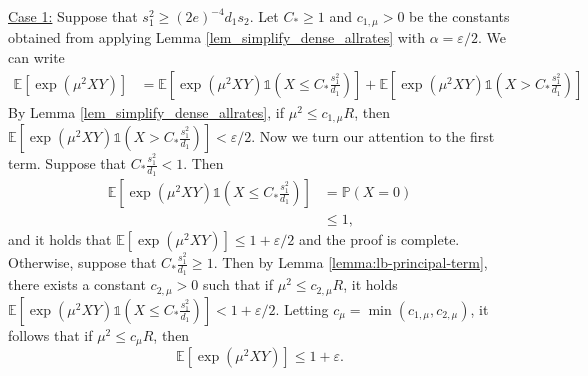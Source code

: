 \documentclass{article}
\newcommand{\bbP}{\mathbb{P}}
\newcommand{\EE}{\mathbb{E}}
\newcommand{\one}{\mathds{1}}
\newcommand{\eps}{\varepsilon} %
\newcommand{\Ct}{C_{*}}
\theoremstyle{remark}
\begin{document}
\bigskip 

\noindent\underline{Case 1:} Suppose that $s_1^2 \geq (2e)^{-4}d_1s_2$. Let $\Ct \geq 1$ and $c_{1, \mu} > 0$ be the constants obtained from applying Lemma \ref{lem_simplify_dense_allrates} with $\alpha = \eps/2$. We can write
\begin{align*}
\EE[\exp(\mu^2XY)] &= \EE[\exp(\mu^2XY)\one(X \leq \Ct \frac{s_1^2}{d_1})] + \EE[\exp(\mu^2XY)\one(X > \Ct \frac{s_1^2}{d_1})]
\end{align*}
By Lemma \ref{lem_simplify_dense_allrates}, if $\mu^2 \leq c_{1, \mu}R$, then $\EE[\exp(\mu^2XY)\one(X > \Ct \frac{s_1^2}{d_1})] < \eps/2$.
Now we turn our attention to the first term. Suppose that $\Ct \frac{s_1^2}{d_1} < 1$. Then
\begin{align*}
    \EE[\exp(\mu^2XY)\one(X \leq \Ct \frac{s_1^2}{d_1})] &= \bbP(X = 0) \\
    &\leq 1,
\end{align*}
and it holds that $\EE[\exp(\mu^2XY)] \leq 1+\eps/2$ and the proof is complete. Otherwise, suppose that $\Ct \frac{s_1^2}{d_1} \geq 1$. Then by Lemma \ref{lemma:lb-principal-term}, there exists a constant $c_{2, \mu} > 0$ such that if $\mu^2 \leq c_{2, \mu}R$, it holds $\EE[\exp(\mu^2XY)\one(X \leq \Ct \frac{s_1^2}{d_1})] < 1 + \eps/2$. Letting $c_\mu = \min(c_{1, \mu}, c_{2, \mu})$, it follows that if $\mu^2 \leq c_\mu R$, then
\[\EE[\exp(\mu^2XY)] \leq 1+\eps.\]
\bigskip 
\end{document}
